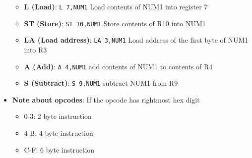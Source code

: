 \documentclass{report}
\begin{document}
\begin{itemize}
\begin{itemize}
                        \item \textbf{L (Load)}: \texttt{L 7,NUM1} Load contents of NUM1 into register 7
                        \item \textbf{ST (Store)}: \texttt{ST 10,NUM1} Store contents of R10 into NUM1
                        \item \textbf{LA (Load address)}: \texttt{LA 3,NUM1} Load address of the first byte of NUM1 into R3
                        \item \textbf{A (Add)}: \texttt{A 4,NUM1} add contents of NUM1 to contents of R4
                        \item \textbf{S (Subtract)}: \texttt{S 9,NUM1} subtract NUM1 from R9
                    \end{itemize}
                    
                \item \textbf{Note about opcodes}: If the opcode has rightmost hex digit
                    \begin{itemize}
                        \item 0-3: 2 byte instruction
                        \item 4-B: 4 byte instruction
                        \item C-F: 6 byte instruction
                    \end{itemize}


    \end{itemize}
\end{document}
